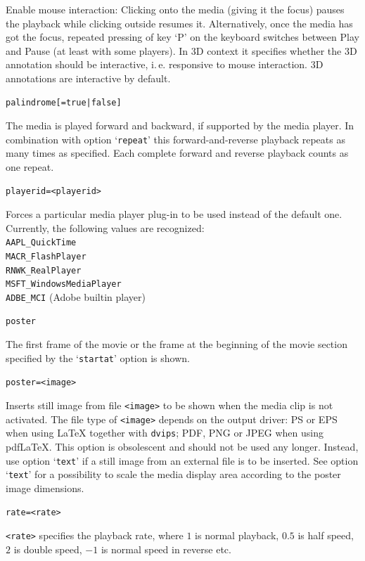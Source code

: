 \documentclass[a4paper]{article}
\begin{document}
Enable mouse interaction: Clicking onto the media (giving it the focus) pauses the playback while clicking outside resumes it. Alternatively, once the media has got the focus, repeated pressing of key `P' on the keyboard switches between Play and Pause (at least with some players). In 3D context it specifies whether the 3D annotation should be interactive, i.\,e. responsive to mouse interaction. 3D annotations are interactive by default.
\begin{verbatim}
palindrome[=true|false]
\end{verbatim}
The media is played forward and backward, if supported by the media player. In combination with option `\verb+repeat+' this forward-and-reverse playback repeats as many times as specified. Each complete forward and reverse playback counts as one repeat.
\begin{verbatim}
playerid=<playerid>
\end{verbatim}
Forces a particular media player plug-in to be used instead of the default one. Currently, the following values are recognized:\\[1ex]
{\tt\phantom{xxxx}AAPL\_QuickTime\\
\phantom{xxxx}MACR\_FlashPlayer\\
\phantom{xxxx}RNWK\_RealPlayer\\
\phantom{xxxx}MSFT\_WindowsMediaPlayer\\
\phantom{xxxx}ADBE\_MCI} (Adobe builtin player)
\begin{verbatim}
poster
\end{verbatim}
The first frame of the movie or the frame at the beginning of the movie section specified by the `\verb+startat+' option is shown.
\begin{verbatim}
poster=<image>
\end{verbatim}
Inserts still image from file \verb+<image>+ to be shown when the media clip is not activated. The file type of \verb+<image>+ depends on the output driver: PS or EPS when using \LaTeX{} together with \verb+dvips+; PDF, PNG or JPEG when using pdf\LaTeX. This option is obsolescent and should not be used any longer. Instead, use option `\verb+text+' if a still image from an external file is to be inserted. See option `\verb+text+' for a possibility to scale the media display area according to the poster image dimensions.
\begin{verbatim}
rate=<rate>
\end{verbatim}
\verb+<rate>+ specifies the playback rate, where $1$ is normal playback, $0.5$ is half speed, $2$ is double speed, $-1$ is normal speed in reverse etc.
\end{document}
